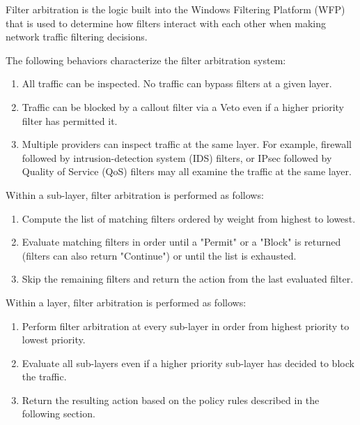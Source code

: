\vspace{5mm}

Filter arbitration is the logic built into the Windows Filtering Platform (WFP) that is used to determine how filters interact with each other when making network traffic filtering decisions.

\vspace{5mm}
The following behaviors characterize the filter arbitration system:
\vspace{5mm}

\begin{enumerate}
\item All traffic can be inspected. No traffic can bypass filters at a given layer.
\item Traffic can be blocked by a callout filter via a Veto even if a higher priority filter has permitted it.
\item Multiple providers can inspect traffic at the same layer. For example, firewall followed by intrusion-detection system (IDS) filters, or IPsec followed by Quality of Service (QoS) filters may all examine the traffic at the same layer.
\end{enumerate}
\vspace{5mm}

Within a sub-layer, filter arbitration is performed as follows:

\vspace{5mm}
\begin{enumerate}
\item Compute the list of matching filters ordered by weight from highest to lowest.
\item Evaluate matching filters in order until a "Permit" or a "Block" is returned (filters can also return "Continue") or until the list is exhausted.
\item Skip the remaining filters and return the action from the last evaluated filter.
\end{enumerate}

\vspace{5mm}
Within a layer, filter arbitration is performed as follows:
\vspace{5mm}

\begin{enumerate}
\item Perform filter arbitration at every sub-layer in order from highest priority to lowest priority.
\item Evaluate all sub-layers even if a higher priority sub-layer has decided to block the traffic.
\item Return the resulting action based on the policy rules described in the following section.
\end{enumerate}

